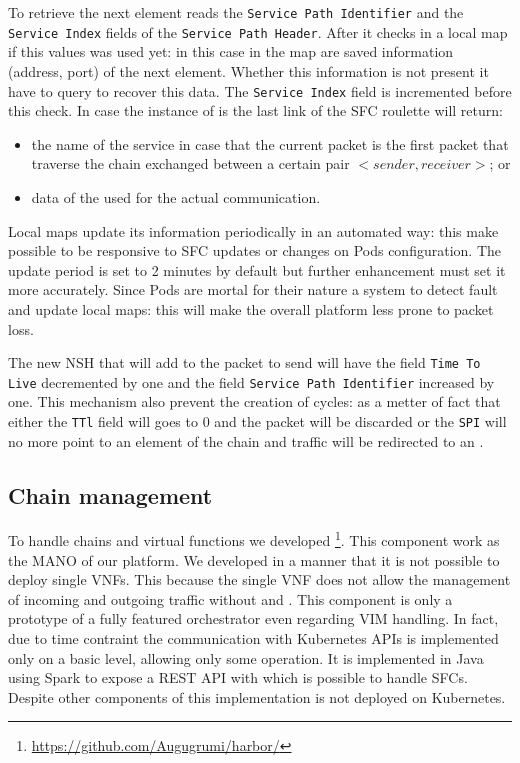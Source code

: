 To retrieve the next element \astaire{} reads the \texttt{Service Path
Identifier} and the \texttt{Service Index} fields of the \texttt{Service Path
Header}. After it checks in a local map if this values was used yet: in this
case in the map are saved information (address, port) of the next element.
Whether this information is not present it have to query \roulette{} to recover
this data. The \texttt{Service Index} field is incremented before this check. In
case the instance of \astaire{} is the last link of the SFC roulette will
return:
\begin{itemize}
  \item the name of the \egress{} service in case that the current packet is the
  first packet that traverse the chain exchanged between a certain pair
  $<sender,receiver>$; or
  \item data of the \egress{} used for the actual communication.
\end{itemize}
Local maps update its information periodically in an automated way: this make
possible to be responsive to SFC updates or changes on Pods configuration. The
update period is set to 2 minutes by default but further enhancement must set it
more accurately. Since Pods are mortal for their nature a system to detect fault
and update local maps: this will make the overall platform less prone to packet
loss.

The new NSH that \astaire{} will add to the packet to send will have the field
\texttt{Time To Live} decremented by one and the field \texttt{Service Path
Identifier} increased by one. This mechanism also prevent the creation of
cycles: as a metter of fact that either the \texttt{TTl} field will goes to $0$
and the packet will be discarded or the \texttt{SPI} will no more point to an
element of the chain and traffic will be redirected to an \egress{}.

\subsection{Chain management}
To handle chains and virtual functions we developed
\harbor{}\footnote{\url{https://github.com/Augugrumi/harbor/}}. This component
work as the MANO of our platform. We developed \harbor{} in a manner that it
is not possible to deploy single VNFs. This because the single VNF does not
allow the management of incoming and outgoing traffic without \ingresses{} and
\egresses{}. This component is only a prototype of a fully featured orchestrator
even regarding VIM handling. In fact, due to time contraint the communication
with Kubernetes APIs is implemented only on a basic level, allowing only some
operation. It is implemented in Java using Spark to expose a REST API with which
is possible to handle SFCs. Despite other components of this implementation 
\harbor{} is not deployed on Kubernetes.

